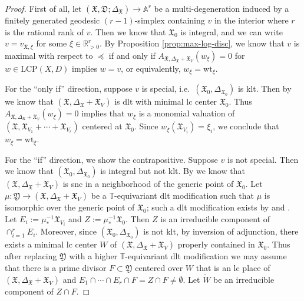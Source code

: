 \documentclass[reqno, 12pt]{amsart}
\theoremstyle{definition}
\newcommand{\bR}{\mathbb{R}}
\newcommand{\bA}{\mathbb{A}}
\newcommand{\bT}{\mathbb{T}}
\newcommand{\tW}{\widetilde{W}}
\newcommand{\wt}{\mathrm{wt}}
\newcommand{\fX}{\mathfrak{X}}
\newcommand{\fD}{\mathfrak{D}}
\newcommand{\fY}{\mathfrak{Y}}
\newcommand{\LCP}{\mathrm{LCP}}
\numberwithin{equation}{section}
\begin{document}
\begin{proof}
    First of all, let $(\fX, \fD; \Delta_{\fX}) \to \bA^r$ be a multi-degeneration induced by a finitely generated geodesic $(r-1)$-simplex containing $v$ in the interior where $r$ is the rational rank of $v$. Then we know that $\fX_0$ is integral, and we can write $v= v_{\fX, \xi}$ for some $\xi\in \bR_{>0}^r$. By Proposition \ref{prop:max-log-disc}, we know that $v$ is maximal with respect to $\preceq$ if and only if $A_{\fX, \Delta_{\fX}+\fX_V}(w_{\xi}) = 0$ for $w\in \LCP(X,D)$ implies $w = v$, or equivalently, $w_{\xi} = \wt_{\xi}$. 

    For the ``only if'' direction, suppose $v$ is special, i.e.\ $(\fX_0, \Delta_{\fX_0})$ is klt. Then by \cite[Proposition 34]{dFKX17} we know that $(\fX, \Delta_{\fX}+\fX_V)$ is dlt with minimal lc center $\fX_0$. Thus $A_{\fX, \Delta_{\fX}+\fX_V}(w_{\xi}) = 0$ implies that $w_{\xi}$ is a monomial valuation of $(\fX,\fX_{V_1}+\cdots + \fX_{V_r})$ centered at $\fX_0$. Since $w_{\xi}(\fX_{V_i}) = \xi_i$, we conclude that $w_{\xi} = \wt_{\xi}$.

    For the ``if'' direction, we show the contrapositive. Suppose $v$ is not special. Then we know that $(\fX_0, \Delta_{\fX_0})$ is integral but not klt. By \cite[Proposition 34]{dFKX17} we know that $(\fX, \Delta_{\fX}+\fX_V)$ is snc in a neighborhood of the generic point of $\fX_0$.
    Let $\mu:\fY \to (\fX, \Delta_{\fX}+\fX_V)$ be a $\bT$-equivariant dlt modification such that $\mu$ is isomorphic over the generic point of $\fX_0$; such a dlt modification exists by \cite{BCHM10} and \cite[Corollary 1.36]{Kol13}. Let $E_i:=\mu_*^{-1} \fX_{V_i}$ and  $Z:=\mu_*^{-1}\fX_0$. Then  $Z$ is an irreducible component of $\cap_{i=1}^r E_i$. Moreover, since $(\fX_0, \Delta_{\fX_0})$ is not klt, by inversion of adjunction, there exists a minimal lc center $W$ of $(\fX, \Delta_{\fX}+\fX_V)$ properly contained in $\fX_0$. Thus after replacing $\fY$ with a higher $\bT$-equivariant dlt modification we may assume that there is a prime divisor $F\subset \fY$ centered over $W$ that is an lc place of  $(\fX, \Delta_{\fX}+\fX_V)$ and $E_1\cap \cdots \cap E_r\cap F = Z\cap F\neq \emptyset$. Let $\tW$ be an irreducible component of $Z\cap F$.


\end{proof}
\end{document}
